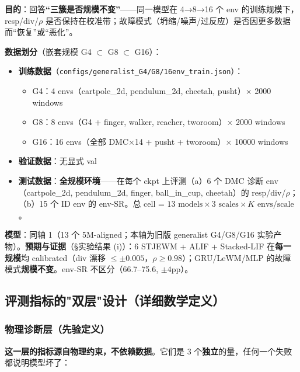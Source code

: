 \documentclass[11pt,a4paper]{article}
\begin{document}
\textbf{目的}：回答\textbf{“三簇是否规模不变”}——同一模型在 4→8→16 个 env 的训练规模下，resp/div/$\rho$ 是否保持在校准带；故障模式（坍缩/噪声/过反应）是否因更多数据而“恢复”或“恶化”。

\textbf{数据划分}（嵌套规模 G4 $\subset$ G8 $\subset$ G16）：
\begin{itemize}[leftmargin=2em]
    \item \textbf{训练数据}（\texttt{configs/generalist\_G4/G8/16env\_train.json}）：
    \begin{itemize}
        \item G4：4 envs（cartpole\_2d, pendulum\_2d, cheetah, pusht）× 2000 windows
        \item G8：8 envs（G4 + finger, walker, reacher, tworoom）× 2000 windows
        \item G16：16 envs（全部 DMC×14 + pusht + tworoom）× 10000 windows
    \end{itemize}
    \item \textbf{验证数据}：无显式 val
    \item \textbf{测试数据}：\textbf{全规模环境}——在每个 ckpt 上评测（a）6 个 DMC 诊断 env（cartpole\_2d, pendulum\_2d, finger, ball\_in\_cup, cheetah）的 resp/div/$\rho$；（b）15 个 ID env 的 env-SR。总 cell = $13 \text{ models} \times 3 \text{ scales} \times K \text{ envs/scale}$。
\end{itemize}

\textbf{模型}：同轴 1（13 个 5M-aligned；本轴为旧版 generalist G4/G8/G16 实验产物）。\textbf{预期与证据}（§实验结果 (i)）：6 STJEWM + ALIF + Stacked-LIF 在\textbf{每一规模}均 calibrated（div 漂移 $\le\pm 0.005$，$\rho \ge 0.98$）；GRU/LeWM/MLP 的故障模式\textbf{规模不变}。env-SR 不区分（66.7--75.6, $\pm 4$pp）。

\subsection{评测指标的"双层"设计（详细数学定义）}

\subsubsection{物理诊断层（先验定义）}

\textbf{这一层的指标源自物理约束，不依赖数据}。它们是 3 个\textbf{独立}的量，任何一个失败都说明模型坏了：
\end{document}
